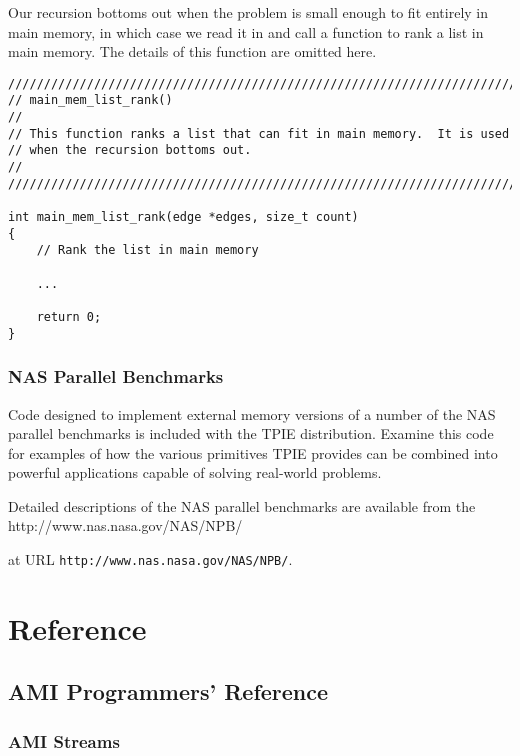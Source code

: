 Our recursion bottoms out when the problem is small enough to fit
entirely in main memory, in which case we read it in and call a
function to rank a list in main memory.  The details of this function
are omitted here.

\begin{verbatim}
////////////////////////////////////////////////////////////////////////
// main_mem_list_rank()
//
// This function ranks a list that can fit in main memory.  It is used
// when the recursion bottoms out.
//
////////////////////////////////////////////////////////////////////////

int main_mem_list_rank(edge *edges, size_t count)
{
    // Rank the list in main memory

    ...
        
    return 0;  
}
\end{verbatim}

\section{NAS Parallel Benchmarks}

Code designed to implement external memory versions of a number of the
NAS parallel benchmarks is included with the TPIE distribution.
Examine this code for examples of how the various primitives TPIE
provides can be combined into powerful applications capable of solving
real-world problems.

Detailed descriptions of the NAS parallel benchmarks are available
from the %
{http://www.nas.nasa.gov/NAS/NPB/}
\begin{latexonly}
at URL \verb|http://www.nas.nasa.gov/NAS/NPB/|.
\end{latexonly}

\part{Reference}

\chapter{AMI Programmers' Reference}

\section{AMI Streams}
\label{sec:ami_stream-ref}

